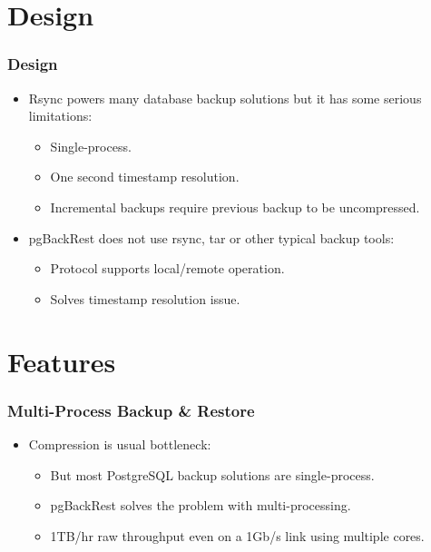 \section{Design}

\begin{frame}
    \frametitle{Design}

    \begin{itemize}
        \item Rsync powers many database backup solutions but it has some serious limitations:\pause

        \begin{itemize}
            \item Single-process.\pause
            \item One second timestamp resolution.\pause
            \item Incremental backups require previous backup to be uncompressed.\pause
        \end{itemize}

        \item pgBackRest does not use rsync, tar or other typical backup tools:\pause

        \begin{itemize}
            \item Protocol supports local/remote operation.\pause
            \item Solves timestamp resolution issue.
        \end{itemize}
    \end{itemize}
\end{frame}

\section{Features}

\begin{frame}
    \frametitle{Multi-Process Backup \& Restore}

    \begin{itemize}
        \item Compression is usual bottleneck:\pause

        \begin{itemize}
            \item But most PostgreSQL backup solutions are single-process.\pause
            \item pgBackRest solves the problem with multi-processing.\pause
            \item 1TB/hr raw throughput even on a 1Gb/s link using multiple cores.
        \end{itemize}
    \end{itemize}
\end{frame}

